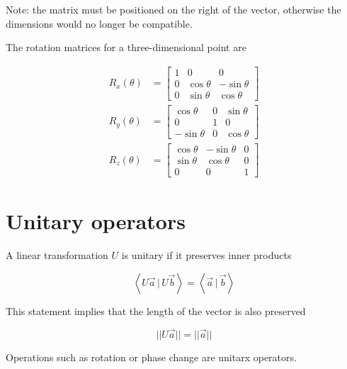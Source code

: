 \documentclass{article}
\newcommand{\braket}[1]{\left\langle#1\right\rangle}
\newcommand{\innerprod}[2]{\braket{#1\,|\,#2}}
\begin{document}
Note: the matrix must be positioned on the right of the vector, otherwise the dimensions would no longer be compatible.

The rotation matrices for a three-dimensional point are

\begin{align*}
    R_x(\theta)&=
    \begin{bmatrix} 
        1 & 0 & 0 \\
        0 & \cos\theta & -\sin\theta \\
        0 & \sin\theta & \cos\theta
    \end{bmatrix}
    \\
    R_y(\theta)&=
    \begin{bmatrix} 
        \cos\theta & 0 & \sin\theta \\
        0 & 1 & 0 \\
        -\sin\theta & 0 & \cos\theta
    \end{bmatrix}
    \\
    R_z(\theta)&=
    \begin{bmatrix} 
        \cos\theta & -\sin\theta & 0 \\
        \sin\theta & \cos\theta & 0 \\
        0 & 0 & 1
    \end{bmatrix}
\end{align*}

\section{Unitary operators}

A linear transformation \(U\) is unitary if it preserves inner products

\[
    \innerprod{U\vec{a}}{U\vec{b}} = \innerprod{\vec{a}}{\vec{b}}
\]

This statement implies that the length of the vector is also preserved

\[
    ||U\vec{a}|| = ||\vec{a}||
\]

Operations such as rotation or phase change are unitarx operators.
\end{document}
